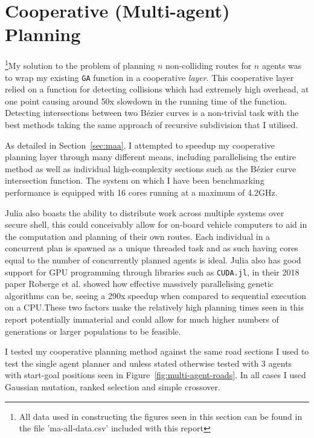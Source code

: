 \section{Cooperative (Multi-agent) Planning}
\label{subsec:eval-cooperativeplanning}

\footnote{All data used in constructing the figures seen in this section can be found in the file 'ma-all-data.csv' included with this report}My solution to the problem of planning $n$ non-colliding routes for $n$ agents was to wrap my existing \texttt{GA} function in a cooperative \textit{layer}. This cooperative layer relied on a function for detecting collisions which had extremely high overhead, at one point causing around 50x slowdown in the running time of the function. Detecting intersections between two Bézier curves is a non-trivial task with the best methods taking the same approach of recursive subdivision that I utilised.

As detailed in Section~\ref{sec:maa}, I attempted to speedup my cooperative planning layer through many different means, including parallelising the entire method as well as individual high-complexity sections such as the Bézier curve intersection function. The system on which I have been benchmarking performance is equipped with 16 cores running at a maximum of 4.2GHz.

Julia also boasts the ability to distribute work across multiple systems over secure shell, this could conceivably allow for on-board vehicle computers to aid in the computation and planning of their own routes. Each individual in a concurrent plan is spawned as a unique threaded task and as such having cores equal to the number of concurrently planned agents is ideal. Julia also has good support for GPU programming through libraries such as \texttt{CUDA.jl}\cite{besard2018juliagpu}, in their 2018 paper Roberge et al.\cite{robergeFastGeneticAlgorithm2018} showed how effective massively parallelising genetic algorithms can be, seeing a 290x speedup when compared to sequential execution on a CPU.\@ These two factors make the relatively high planning times seen in this report potentially immaterial and could allow for much higher numbers of generations or larger populations to be feasible.

I tested my cooperative planning method against the same road sections I used to test the single agent planner and unless stated otherwise tested with 3 agents with start-goal positions seen in Figure~\ref{fig:multi-agent-roads}. In all cases I used Gaussian mutation, ranked selection and simple crossover.

